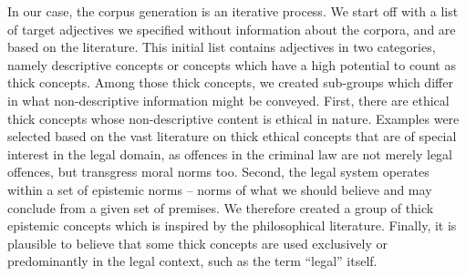 \documentclass{article}
\begin{document}
In our case, the corpus generation is an iterative process. We start off with a list of target adjectives we specified without information about the corpora, and are based on the literature. This initial list contains adjectives in two categories, namely descriptive concepts or concepts which have a high potential to count as thick concepts. Among those thick concepts, we created sub-groups which differ in what non-descriptive information might be conveyed. First, there are ethical thick concepts whose non-descriptive content is ethical in nature. Examples were selected based on the vast literature on thick ethical concepts that are of special interest in the legal domain, as offences in the criminal law are not merely legal offences, but transgress moral norms too. Second, the legal system operates within a set of epistemic norms -- norms of what we should believe and may conclude from a given set of premises. We therefore created a group of thick epistemic concepts which is inspired by the philosophical literature. Finally, it is plausible to believe that some thick concepts are used exclusively or predominantly in the legal context, such as the term \enquote{legal} itself. 
\end{document}
